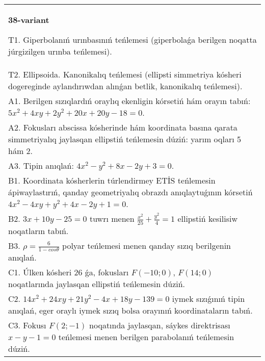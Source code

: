 \documentclass{article}
\begin{document}
\begin{tabular}{m{17cm}}
\textbf{38-variant}
\newline

T1. Giperbolanıń urınbasınıń teńlemesi (giperbolaǵa berilgen noqatta júrgizilgen urınba teńlemesi).\\

T2. Ellipsoida. Kanonikalıq teńlemesi (ellipsti simmetriya kósheri dogereginde aylandırıwdan alınǵan betlik, kanonikalıq teńlemesi).\\

A1. Berilgen sızıqlardıń oraylıq ekenligin kórsetiń hám orayın tabıń: $5 x^{2}+4 xy+2 y^{2}+20 x+20 y-18=0$.\\

A2. Fokusları abscissa kósherinde hám koordinata basına qarata simmetriyalıq jaylasqan ellipstiń teńlemesin dúziń: yarım oqları 5 hám 2.\\

A3. Tipin anıqlań: $4 x^{2}-y^{2}+8 x-2 y+3=0$.\\

B1. Koordinata kósherlerin túrlendirmey ETİS teńlemesin ápiwaylastırıń, qanday geometriyalıq obrazdı anıqlaytuǵının kórsetiń $4x^{2} - 4xy + y^{2} + 4x - 2y + 1 = 0$.  \\

B2. $3x + 10y - 25 = 0$ tuwrı menen $\frac{x^{2}}{25} + \frac{y^{2}}{4} = 1$ ellipstiń kesilisiw noqatların tabıń.\\

B3. $\rho = \frac{6}{1 - cos\theta}$ polyar teńlemesi menen qanday sızıq berilgenin anıqlań.  \\

C1. Úlken kósheri 26 ǵa, fokusları $F( - 10;0)$, $F(14;0)$ noqatlarında jaylasqan ellipstiń teńlemesin dúziń.  \\

C2. $14x^{2} + 24xy + 21y^{2} - 4x + 18y - 139 = 0$ iymek sızıǵınıń tipin anıqlań, eger oraylı iymek sızıq bolsa orayınıń koordinataların tabıń.  \\

C3. Fokusı $F(2; - 1)$ noqatında jaylasqan, sáykes direktrisası $x - y - 1 = 0$ teńlemesi menen berilgen parabolanıń teńlemesin dúziń.  \\

\end{tabular}
\vspace{1cm}
\end{document}
